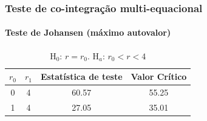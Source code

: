 \documentclass{beamer}
\begin{document}
\begin{frame}
    \frametitle{Teste de co-integração multi-equacional}
    \framesubtitle{Teste de Johansen (máximo autovalor)}
    \begin{table}[!hbt]
        \begin{tabular}{|cccc|}
            \hline
            $ r_0 $ & $ r_1 $ & Estatística de teste & Valor Crítico \\
            \hline
            0 &             4 &                   60.57 &                   55.25  \\
            1 &             4 &                   27.05 &                   35.01  \\
            \hline
        \end{tabular}
        \caption*{$ \text{H}_0 $: $ r =  r_0 $. $ \text{H}_a $: $ r_0 < r < 4 $}
    \end{table}
\end{frame}
\end{document}
